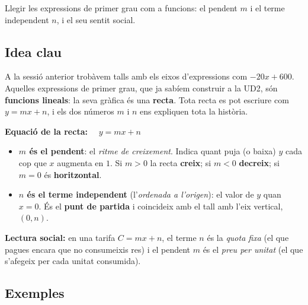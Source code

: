 %
{Llegir les expressions de primer grau com a funcions: el pendent $m$ i el terme independent $n$, i el seu sentit social.}

\subsection{Idea clau}

A la sessió anterior trobàvem talls amb els eixos d'expressions com $-20x+600$.
Aquelles expressions de primer grau, que ja sabíem construir a la UD2, són
\textbf{funcions lineals}: la seva gràfica és una \textbf{recta}. Tota recta es pot
escriure com $y=mx+n$, i els dos números $m$ i $n$ ens expliquen tota la història.

\begin{idea}
\textbf{Equació de la recta:} $\quad y=mx+n$
\begin{itemize}[leftmargin=1.4em, itemsep=2pt]
  \item \textbf{$m$ és el pendent}: el \emph{ritme de creixement}. Indica quant puja
        (o baixa) $y$ cada cop que $x$ augmenta en $1$.
        Si $m>0$ la recta \textbf{creix}; si $m<0$ \textbf{decreix}; si $m=0$ és
        \textbf{horitzontal}.
  \item \textbf{$n$ és el terme independent} (l'\emph{ordenada a l'origen}): el valor
        de $y$ quan $x=0$. És el \textbf{punt de partida} i coincideix amb el tall amb
        l'eix vertical, $(0,n)$.
\end{itemize}
\textbf{Lectura social:} en una tarifa $C=mx+n$, el terme $n$ és la
\emph{quota fixa} (el que pagues encara que no consumeixis res) i el pendent $m$ és
el \emph{preu per unitat} (el que s'afegeix per cada unitat consumida).
\end{idea}

\subsection{Exemples}

